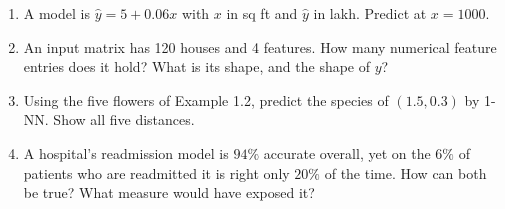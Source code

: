 \documentclass[11pt]{article}
\begin{document}
\begin{tryit}
\begin{enumerate}[label=\textbf{E1.\arabic*}]
  \item A model is $\hat y = 5 + 0.06x$ with $x$ in sq ft and $\hat y$ in lakh.
    Predict at $x = 1000$.
  \item An input matrix has 120 houses and 4 features. How many numerical
    feature entries does it hold? What is its shape, and the shape of $y$?
  \item Using the five flowers of Example 1.2, predict the species of
    $(1.5, 0.3)$ by 1-NN. Show all five distances.
  \item A hospital's readmission model is $94\%$ accurate overall, yet on the
    $6\%$ of patients who are readmitted it is right only $20\%$ of the time.
    How can both be true? What measure would have exposed it?
\end{enumerate}
\end{tryit}
\end{document}
